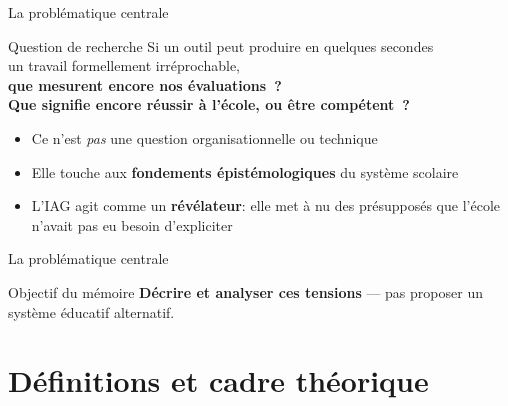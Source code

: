 \begin{frame}{La problématique centrale}
  \begin{block}{Question de recherche}
    \centering\large
    Si un outil peut produire en quelques secondes\\
    un travail formellement irréprochable,\\[0.4em]
    \textbf{que mesurent encore nos évaluations~?}\\
    \textbf{Que signifie encore réussir à l'école, ou être compétent~?}
  \end{block}

  \vspace{0.8em}

  \begin{itemize}
    \item Ce n'est \emph{pas} une question organisationnelle ou technique
    \item Elle touche aux \textbf{fondements épistémologiques} du système scolaire
    \item L'IAG agit comme un \textbf{révélateur}: elle met à nu des présupposés
          que l'école n'avait pas eu besoin d'expliciter
  \end{itemize}
\end{frame}

\begin{frame}{La problématique centrale}
  \begin{block}{Objectif du mémoire}
    \textbf{Décrire et analyser ces tensions} ---
    pas proposer un système éducatif alternatif.
  \end{block}
\end{frame}

\section{Définitions et cadre théorique}

